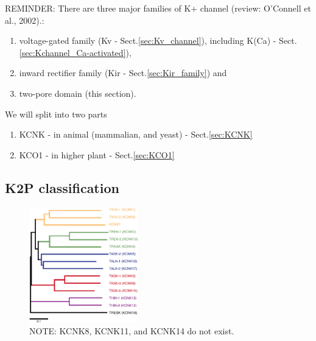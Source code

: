 \begin{mdframed}

REMINDER: There are three major families of K+ channel (review: O'Connell et
al., 2002).:
\begin{enumerate}
  
  \item voltage-gated family (Kv - Sect.\ref{sec:Kv_channel}), including K(Ca) -
  Sect.\ref{sec:Kchannel_Ca-activated}),

  \item inward rectifier family (Kir - Sect.\ref{sec:Kir_family}) and 
  
  \item two-pore domain (this section).
\end{enumerate}

\end{mdframed}

We will split into two parts
\begin{enumerate}
    \item KCNK - in animal (mammalian, and yeast) - Sect.\ref{sec:KCNK}
    \item KCO1 - in higher plant - Sect.\ref{sec:KCO1}
\end{enumerate}

\subsection{K2P classification}
\label{sec:K2P-classification}

\begin{figure}[hbt]
  \centerline{\includegraphics[height=5cm,
    angle=0]{./images/K2P_classification.eps}}
  \caption{NOTE: KCNK8, KCNK11, and KCNK14 do not exist.}
\label{fig:K2P_classification}
\end{figure}

